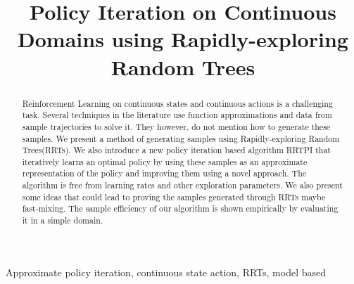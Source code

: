 \documentclass[wcp]{jmlr}
\title[RRTPI]{Policy Iteration on Continuous Domains using Rapidly-exploring Random Trees}
\begin{document}
\maketitle

\begin{abstract}
Reinforcement Learning on continuous states and continuous actions is a challenging task. Several techniques in the literature use function approximations and data from sample trajectories to solve it. They however, do not mention how to generate these samples. We present a method of generating samples using Rapidly-exploring Random Trees(RRTs). We also introduce a new policy iteration based algorithm RRTPI that iteratively learns an optimal policy by using these samples as an approximate representation of the policy and improving them using a novel approach. The algorithm is free from learning rates and other exploration parameters. We also present some ideas that could lead to proving the samples generated through RRTs maybe fast-mixing. The sample efficiency of our algorithm is shown empirically by evaluating it in a simple domain. 
\end{abstract}
\begin{keywords}
Approximate policy iteration, continuous state action, RRTs, model based
\end{keywords}
\end{document}
